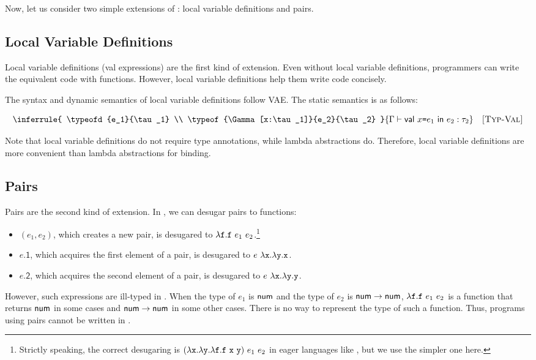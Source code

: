 Now, let us consider two simple extensions of \Lang: local variable definitions
and pairs.

\subsection{Local Variable Definitions}

Local variable definitions (\textsf{val} expressions)
are the first kind of extension. Even without
local variable definitions, programmers can write the equivalent code with
functions. However, local variable definitions help them write
code concisely.

The syntax and dynamic semantics of local variable definitions follow \textsf{VAE}.
The static semantics is as follows:


\vspace{-1em}

\[
  \inferrule
  {
    \typeofd{e_1}{\tau_1} \\
    \typeof{\Gamma[x:\tau_1]}{e_2}{\tau_2}
  }
  { \typeofd{\ebind{x}{e_1}{e_2}}{\tau_2} }
  \quad\textsc{[Typ-Val]}
\]

Note that local variable definitions do not require type annotations, while
lambda abstractions do. Therefore, local variable definitions are more
convenient than lambda abstractions for binding.

\subsection{Pairs}

Pairs are the second kind of extension. In \plang, we can desugar pairs to
functions:
\begin{itemize}
  \item $(e_1,e_2)$, which creates a new pair, is desugared to $\lambda\texttt{f}.\texttt{f}\ e_1\
    e_2$.\footnote{Strictly speaking, the correct desugaring is
    $(\efun{\cx}{\efun{\cy}{\efun{\cf}{\cf\ \cx\ \cy}}})\ e_1\ e_2$ in eager
    languages like \plang, but we use the simpler one here.}
  \item $e\textsf{.1}$, which acquires the first element of a pair,
    is desugared to $e\ \lambda\texttt{x}.\lambda\texttt{y}.\texttt{x}$.
  \item $e\textsf{.2}$, which acquires the second element of a pair,
    is desugared to $e\ \lambda\texttt{x}.\lambda\texttt{y}.\texttt{y}$.
\end{itemize}
However, such expressions are ill-typed in \Lang.
When the type of $e_1$ is $\textsf{num}$ and the type of $e_2$ is $\textsf{num}\rightarrow\textsf{num}$,
$\lambda\texttt{f}.\texttt{f}\ e_1\ e_2$ is a function that returns $\textsf{num}$ in some cases and
$\textsf{num}\rightarrow\textsf{num}$ in some other cases. There is no way to represent the
type of such a function. Thus, programs using pairs cannot be written in \Lang.

